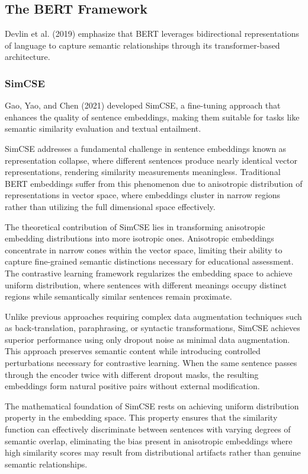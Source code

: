 \subsection{The BERT Framework}

Devlin et al. (2019) emphasize that BERT leverages bidirectional representations of language to capture semantic relationships through its transformer-based architecture.

\subsubsection{SimCSE}

Gao, Yao, and Chen (2021) developed SimCSE, a fine-tuning approach that enhances the quality of sentence embeddings, making them suitable for tasks like semantic similarity evaluation and textual entailment.

{\color{maroon}
SimCSE addresses a fundamental challenge in sentence embeddings known as representation collapse, where different sentences produce nearly identical vector representations, rendering similarity measurements meaningless. Traditional BERT embeddings suffer from this phenomenon due to anisotropic distribution of representations in vector space, where embeddings cluster in narrow regions rather than utilizing the full dimensional space effectively.

The theoretical contribution of SimCSE lies in transforming anisotropic embedding distributions into more isotropic ones. Anisotropic embeddings concentrate in narrow cones within the vector space, limiting their ability to capture fine-grained semantic distinctions necessary for educational assessment. The contrastive learning framework regularizes the embedding space to achieve uniform distribution, where sentences with different meanings occupy distinct regions while semantically similar sentences remain proximate.

Unlike previous approaches requiring complex data augmentation techniques such as back-translation, paraphrasing, or syntactic transformations, SimCSE achieves superior performance using only dropout noise as minimal data augmentation. This approach preserves semantic content while introducing controlled perturbations necessary for contrastive learning. When the same sentence passes through the encoder twice with different dropout masks, the resulting embeddings form natural positive pairs without external modification.

The mathematical foundation of SimCSE rests on achieving uniform distribution property in the embedding space. This property ensures that the similarity function can effectively discriminate between sentences with varying degrees of semantic overlap, eliminating the bias present in anisotropic embeddings where high similarity scores may result from distributional artifacts rather than genuine semantic relationships.
}

